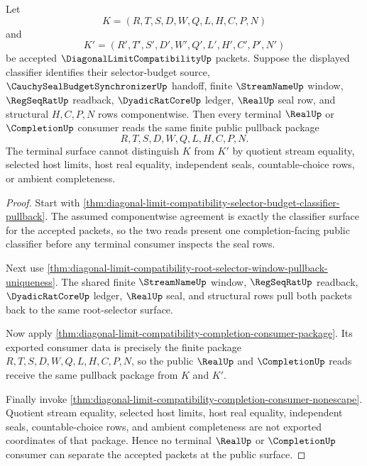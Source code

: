 \begin{theorem}
\label{thm:diagonal-limit-compatibility-selector-budget-terminal-pullback}
Let
$$
K=(R,T,S,D,W,Q,L,H,C,P,N)
$$
and
$$
K'=(R',T',S',D',W',Q',L',H',C',P',N')
$$
be accepted $\DiagonalLimitCompatibilityUp$ packets. Suppose the displayed classifier identifies their selector-budget source, $\CauchySealBudgetSynchronizerUp$ handoff, finite $\StreamNameUp$ window, $\RegSeqRatUp$ readback, $\DyadicRatCoreUp$ ledger, $\RealUp$ seal row, and structural $H,C,P,N$ rows componentwise. Then every terminal $\RealUp$ or $\CompletionUp$ consumer reads the same finite public pullback package
$$
R,T,S,D,W,Q,L,H,C,P,N .
$$
The terminal surface cannot distinguish $K$ from $K'$ by quotient stream equality, selected host limits, host real equality, independent seals, countable-choice rows, or ambient completeness.
\end{theorem}
\begin{proof}
Start with \autoref{thm:diagonal-limit-compatibility-selector-budget-classifier-pullback}. The assumed componentwise agreement is exactly the classifier surface for the accepted packets, so the two reads present one completion-facing public classifier before any terminal consumer inspects the seal rows.

Next use \autoref{thm:diagonal-limit-compatibility-root-selector-window-pullback-uniqueness}. The shared finite $\StreamNameUp$ window, $\RegSeqRatUp$ readback, $\DyadicRatCoreUp$ ledger, $\RealUp$ seal, and structural rows pull both packets back to the same root-selector surface.

Now apply \autoref{thm:diagonal-limit-compatibility-completion-consumer-package}. Its exported consumer data is precisely the finite package $R,T,S,D,W,Q,L,H,C,P,N$, so the public $\RealUp$ and $\CompletionUp$ reads receive the same pullback package from $K$ and $K'$.

Finally invoke \autoref{thm:diagonal-limit-compatibility-completion-consumer-nonescape}. Quotient stream equality, selected host limits, host real equality, independent seals, countable-choice rows, and ambient completeness are not exported coordinates of that package. Hence no terminal $\RealUp$ or $\CompletionUp$ consumer can separate the accepted packets at the public surface.
\end{proof}


